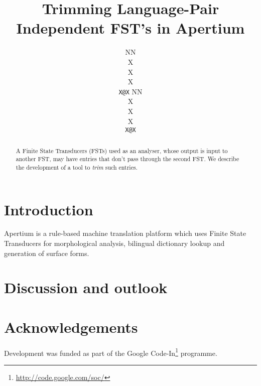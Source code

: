 \documentclass[11pt]{article}
\author{NN\\  X \\ X \\  X \\  {\tt \small   X@X} \And  NN \\  X \\  X \\  X \\    {\tt \small  X@X}}
\title{Trimming Language-Pair Independent FST's in Apertium}
\begin{document}
\maketitle

\begin{abstract}
  A Finite State Transducers (FSTs) used as an analyser, whose output
  is input to another FST, may have entries that don't pass through
  the second FST. We describe the development of a tool to \emph{trim}
  such entries.
\end{abstract}

\section{Introduction}
Apertium is a rule-based machine translation platform which uses
Finite State Transducers for morphological analysis, bilingual
dictionary lookup and generation of surface forms.



\section{Discussion and outlook}
\section*{Acknowledgements}
Development was funded as part of the Google
Code-In\footnote{\href{http://code.google.com/soc/}{http://code.google.com/soc/}
} programme.




\end{document}
